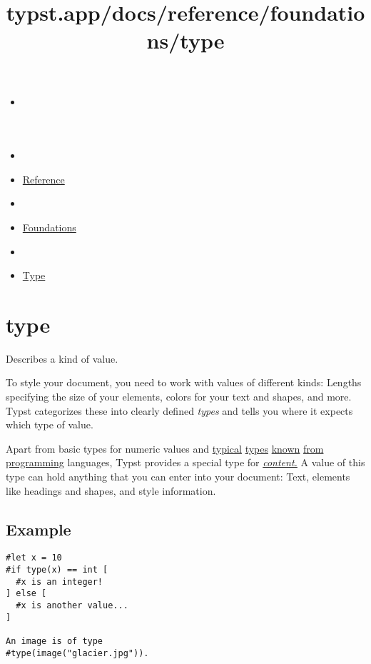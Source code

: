 \title{typst.app/docs/reference/foundations/type}

\begin{itemize}
\tightlist
\item
  \href{/docs}{}
\item
  
\item
  \href{/docs/reference/}{Reference}
\item
  
\item
  \href{/docs/reference/foundations/}{Foundations}
\item
  
\item
  \href{/docs/reference/foundations/type/}{Type}
\end{itemize}

\section{\texorpdfstring{{ type }}{ type }}\label{summary}

Describes a kind of value.

To style your document, you need to work with values of different kinds:
Lengths specifying the size of your elements, colors for your text and
shapes, and more. Typst categorizes these into clearly defined
\emph{types} and tells you where it expects which type of value.

Apart from basic types for numeric values and
\href{/docs/reference/foundations/int/}{typical}
\href{/docs/reference/foundations/float/}{types}
\href{/docs/reference/foundations/str/}{known}
\href{/docs/reference/foundations/array/}{from}
\href{/docs/reference/foundations/dictionary/}{programming} languages,
Typst provides a special type for
\href{/docs/reference/foundations/content/}{\emph{content.}} A value of
this type can hold anything that you can enter into your document: Text,
elements like headings and shapes, and style information.

\subsection{Example}\label{example}

\begin{verbatim}
#let x = 10
#if type(x) == int [
  #x is an integer!
] else [
  #x is another value...
]

An image is of type
#type(image("glacier.jpg")).
\end{verbatim}

